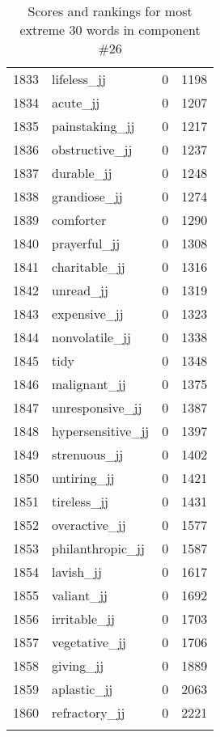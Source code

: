 \begin{longtable}[!htbp]{| rlr@{.}l |}
    1833 & lifeless\_jj & 0 & 1198 \\
    1834 & acute\_jj & 0 & 1207 \\
    1835 & painstaking\_jj & 0 & 1217 \\
    1836 & obstructive\_jj & 0 & 1237 \\
    1837 & durable\_jj & 0 & 1248 \\
    1838 & grandiose\_jj & 0 & 1274 \\
    1839 & comforter & 0 & 1290 \\
    1840 & prayerful\_jj & 0 & 1308 \\
    1841 & charitable\_jj & 0 & 1316 \\
    1842 & unread\_jj & 0 & 1319 \\
    1843 & expensive\_jj & 0 & 1323 \\
    1844 & nonvolatile\_jj & 0 & 1338 \\
    1845 & tidy & 0 & 1348 \\
    1846 & malignant\_jj & 0 & 1375 \\
    1847 & unresponsive\_jj & 0 & 1387 \\
    1848 & hypersensitive\_jj & 0 & 1397 \\
    1849 & strenuous\_jj & 0 & 1402 \\
    1850 & untiring\_jj & 0 & 1421 \\
    1851 & tireless\_jj & 0 & 1431 \\
    1852 & overactive\_jj & 0 & 1577 \\
    1853 & philanthropic\_jj & 0 & 1587 \\
    1854 & lavish\_jj & 0 & 1617 \\
    1855 & valiant\_jj & 0 & 1692 \\
    1856 & irritable\_jj & 0 & 1703 \\
    1857 & vegetative\_jj & 0 & 1706 \\
    1858 & giving\_jj & 0 & 1889 \\
    1859 & aplastic\_jj & 0 & 2063 \\
    1860 & refractory\_jj & 0 & 2221 \\
    \hline
    \caption{Scores and rankings for most extreme 30 words in component \#26} \\
\end{longtable}
